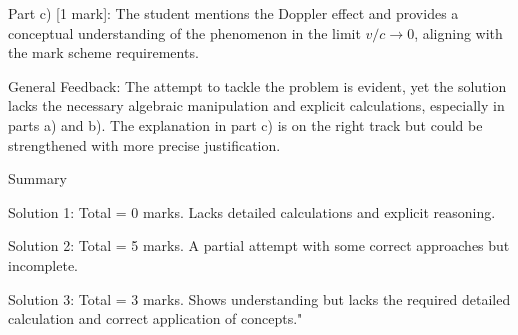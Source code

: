 \documentclass[a4paper,11pt]{article}
\begin{document}
Part c) [1 mark]: The student mentions the Doppler effect and provides a conceptual understanding of the phenomenon in the limit \( v/c \rightarrow 0\), aligning with the mark scheme requirements.

General Feedback: The attempt to tackle the problem is evident, yet the solution lacks the necessary algebraic manipulation and explicit calculations, especially in parts a) and b). The explanation in part c) is on the right track but could be strengthened with more precise justification.

Summary

Solution 1: Total = 0 marks. Lacks detailed calculations and explicit reasoning.

Solution 2: Total = 5 marks. A partial attempt with some correct approaches but incomplete.

Solution 3: Total = 3 marks. Shows understanding but lacks the required detailed calculation and correct application of concepts."
\end{document}
